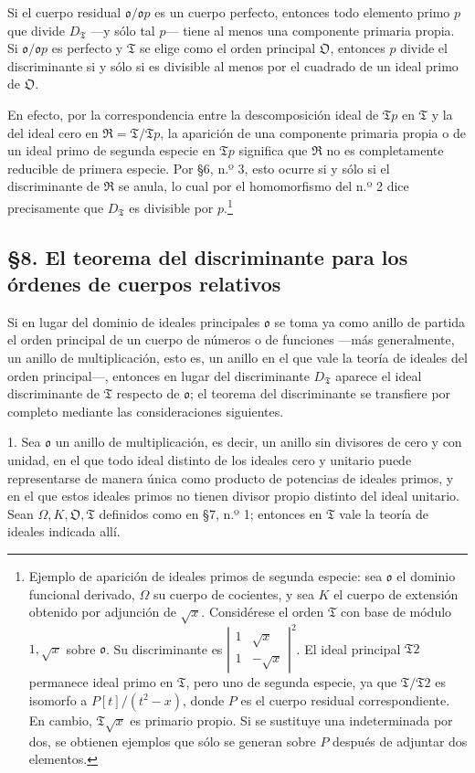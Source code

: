 \documentclass[11pt]{article}
\providecommand{\mR}{\mathfrak{R}}
\providecommand{\mT}{\mathfrak{T}}
\providecommand{\mO}{\mathfrak{O}}
\providecommand{\mo}{\mathfrak{o}}
\begin{document}
Si el cuerpo residual $\mo/\mo p$ es un cuerpo perfecto, entonces todo elemento primo $p$ que divide $D_\mT$ ---y sólo tal $p$--- tiene al menos una componente primaria propia. Si $\mo/\mo p$ es perfecto y $\mT$ se elige como el orden principal $\mO$, entonces $p$ divide el discriminante si y sólo si es divisible al menos por el cuadrado de un ideal primo de $\mO$.

En efecto, por la correspondencia entre la descomposición ideal de $\mT p$ en $\mT$ y la del ideal cero en $\mR=\mT/\mT p$, la aparición de una componente primaria propia o de un ideal primo de segunda especie en $\mT p$ significa que $\mR$ no es completamente reducible de primera especie. Por \S 6, n.º 3, esto ocurre si y sólo si el discriminante de $\mR$ se anula, lo cual por el homomorfismo del n.º 2 dice precisamente que $D_\mT$ es divisible por $p$.\footnote{Ejemplo de aparición de ideales primos de segunda especie: sea $\mo$ el dominio funcional derivado, $\Omega$ su cuerpo de cocientes, y sea $K$ el cuerpo de extensión obtenido por adjunción de $\sqrt{x}$. Considérese el orden $\mT$ con base de módulo $1,\sqrt{x}$ sobre $\mo$. Su discriminante es $\left|\begin{smallmatrix}1&\sqrt{x}\\1&-\sqrt{x}\end{smallmatrix}\right|^2$. El ideal principal $\mT2$ permanece ideal primo en $\mT$, pero uno de segunda especie, ya que $\mT/\mT2$ es isomorfo a $P[t]/(t^2-x)$, donde $P$ es el cuerpo residual correspondiente. En cambio, $\mT\sqrt{x}$ es primario propio. Si se sustituye una indeterminada por dos, se obtienen ejemplos que sólo se generan sobre $P$ después de adjuntar dos elementos.}

\subsection*{\S 8. El teorema del discriminante para los órdenes de cuerpos relativos}

Si en lugar del dominio de ideales principales $\mo$ se toma ya como anillo de partida el orden principal de un cuerpo de números o de funciones ---más generalmente, un anillo de multiplicación, esto es, un anillo en el que vale la teoría de ideales del orden principal---, entonces en lugar del discriminante $D_\mT$ aparece el ideal discriminante de $\mT$ respecto de $\mo$; el teorema del discriminante se transfiere por completo mediante las consideraciones siguientes.

1. Sea $\mo$ un anillo de multiplicación, es decir, un anillo sin divisores de cero y con unidad, en el que todo ideal distinto de los ideales cero y unitario puede representarse de manera única como producto de potencias de ideales primos, y en el que estos ideales primos no tienen divisor propio distinto del ideal unitario. Sean $\Omega,K,\mO,\mT$ definidos como en \S 7, n.º 1; entonces en $\mT$ vale la teoría de ideales indicada allí.
\end{document}
